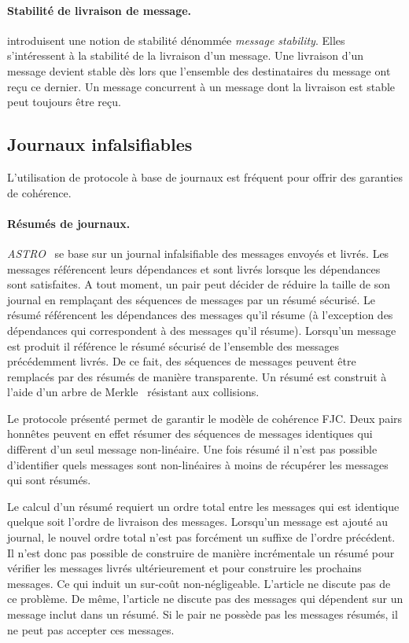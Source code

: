 \paragraph{Stabilité de livraison de message.} \textcite{birman_1991_causalmulticast} introduisent une notion de stabilité dénommée \emph{message stability}.
Elles s'intéressent à la stabilité de  la livraison d'un message.
Une livraison d'un message devient stable dès lors que l'ensemble des destinataires du message ont reçu ce dernier.
Un message concurrent à un message dont la livraison est stable peut toujours être reçu.


\subsection{Journaux infalsifiables}



L'utilisation de protocole à base de journaux est fréquent pour offrir des garanties de cohérence.

\paragraph{Résumés de journaux.} \emph{ASTRO}~\autocite{mahajan_astro_2008} se base sur un journal infalsifiable des messages envoyés et livrés.
Les messages référencent leurs dépendances et sont livrés lorsque les dépendances sont satisfaites.
A tout moment, un pair peut décider de réduire la taille de son journal en remplaçant des séquences de messages par un résumé sécurisé.
Le résumé référencent les dépendances des messages qu'il résume (à l'exception des dépendances qui correspondent à des messages qu'il résume).
Lorsqu'un message est produit il référence le résumé sécurisé de l'ensemble des messages précédemment livrés.
De ce fait, des séquences de messages peuvent être remplacés par des résumés de manière transparente.
Un résumé est construit à l'aide d'un arbre de Merkle~\autocite{merkle_1979_merkletree} résistant aux collisions.

Le protocole présenté permet de garantir le modèle de cohérence \acf{FJC}.
Deux pairs honnêtes peuvent en effet résumer des séquences de messages identiques qui diffèrent d'un seul message non-linéaire.
Une fois résumé il n'est pas possible d'identifier quels messages sont non-linéaires à moins de récupérer les messages qui sont résumés.

Le calcul d'un résumé requiert un ordre total entre les messages qui est identique quelque soit l'ordre de livraison des messages.
Lorsqu'un message est ajouté au journal, le nouvel ordre total n'est pas forcément un suffixe de l'ordre précédent.
Il n'est donc pas possible de construire de manière incrémentale un résumé pour vérifier les messages livrés ultérieurement et pour construire les prochains messages.
Ce qui induit un sur-coût non-négligeable.
L'article ne discute pas de ce problème.
De même, l'article ne discute pas des messages qui dépendent sur un message inclut dans un résumé.
Si le pair ne possède pas les messages résumés, il ne peut pas accepter ces messages.

